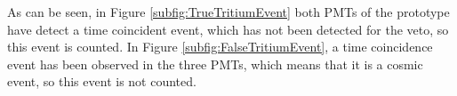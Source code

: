\begin{enumerate}
As can be seen, in Figure \ref{subfig:TrueTritiumEvent} both PMTs of the prototype have detect a time coincident event, which has not been detected for the veto, so this event is counted. In Figure \ref{subfig:FalseTritiumEvent}, a time coincidence event has been observed in the three PMTs, which means that it is a cosmic event, so this event is not counted.
\end{enumerate}